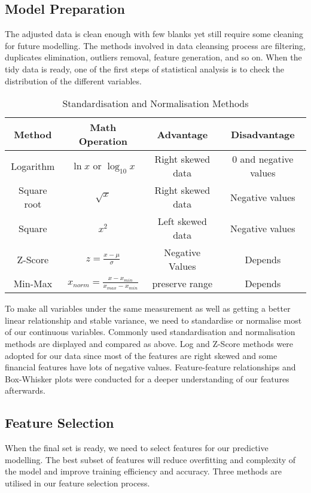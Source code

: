 \subsection{Model Preparation}
The adjusted data is clean enough with few blanks yet still require some cleaning for future modelling. The methods involved in data cleansing process are filtering, duplicates elimination, outliers removal, feature generation, and so on.  When the tidy data is ready, one of the first steps of statistical analysis is to check the distribution of the different variables. 
\begin{table}[H]
\caption{Standardisation and Normalisation Methods}
\begin{center}
\begin{tabular}{|c|c|c|c|}
\hline
\rowcolor{Graylight}
Method & Math Operation & Advantage & Disadvantage\\
\hline
Logarithm  & $\ln{x}$ or $\log_{10}x$ & Right skewed data & 0 and negative values\\
\hline
\rowcolor{Gray}
Square root & $\sqrt{x}$ &  Right skewed data & Negative values\\
\hline
Square & $x^2$ & Left skewed data & Negative values\\
\hline
\rowcolor{Gray}
Z-Score & $z=\frac{x-\mu}{\sigma}$ & Negative Values & Depends\\
\hline
Min-Max & $x_{norm}=\frac{x-x_{min}}{x_{max}-x_{min}}$ & preserve range & Depends\\
\hline
\end{tabular}
\end{center}
\end{table}
To make all variables under the same measurement as well as getting a better linear relationship and stable variance, we need to standardise or normalise most of our continuous variables. Commonly used standardisation and normalisation methods are displayed and compared as above. Log and Z-Score methods were adopted for our data since most of the features are right skewed and some financial features have lots of negative values. Feature-feature relationships and Box-Whisker plots were conducted for a deeper understanding of our features afterwards. 
\subsection{Feature Selection}
When the final set is ready, we need to select features for our predictive modelling. The best subset of features will reduce overfitting and complexity of the model and improve training efficiency and accuracy. Three methods are utilised in our feature selection process. 
